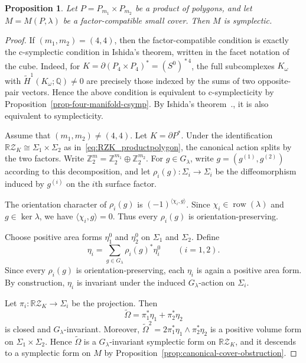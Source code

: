 \documentclass{amsart}
\newtheorem{proposition}[theorem]{Proposition}
\numberwithin{equation}{section}
\theoremstyle{definition}
\theoremstyle{remark}
\newcommand{\Z}{\mathbb Z}
\newcommand{\Q}{\mathbb Q}
\newcommand{\RZ}{\mathbb R\mathcal Z}
\DeclareMathOperator{\join}{\ast}
\DeclareMathOperator{\row}{row}
\begin{document}
\begin{proposition}\label{prop:factor-compatible-symplectic}
    Let $P=P_{m_1}\times P_{m_2}$ be a product of polygons, and let $M=M(P,\lambda)$ be a factor-compatible small cover.
    Then $M$ is symplectic.
\end{proposition}
\begin{proof}
    If $(m_1,m_2)=(4,4)$, then the factor-compatible condition is exactly the c-symplectic condition in Ishida's theorem, written in the facet notation of the cube. 
    Indeed, for $K=\partial(P_4\times P_4)^\ast=(S^0)^{\join 4}$, the full subcomplexes $K_\omega$ with $\widetilde H^1(K_\omega;\Q)\neq 0$ are precisely those indexed by the sums of two opposite-pair vectors. 
    Hence the above condition is equivalent to c-symplecticity by Proposition~\ref{prop-four-manifold-csymp}.
    By Ishida's theorem~\cite{Ishida2011}., it is also equivalent to symplecticity.
    
    Assume that $(m_1,m_2)\neq(4,4)$.
    Let $K=\partial P^\ast$.
    Under the identification $\RZ_K\cong \Sigma_1\times\Sigma_2$ as in~\eqref{eq:RZK_productpolygon}, the canonical action splits by the two factors.
    Write $\Z_2^m=\Z_2^{m_1}\oplus\Z_2^{m_2}$.
    For $g\in G_\lambda$, write $g=(g^{(1)},g^{(2)})$ according to this decomposition, and let $\rho_i(g)\colon \Sigma_i\to\Sigma_i$ be the diffeomorphism induced by $g^{(i)}$ on the $i$th surface factor.
    
    The orientation character of $\rho_i(g)$ is $(-1)^{\langle \chi_i,g\rangle}$.
    Since $\chi_i\in\row(\lambda)$ and $g\in\ker\lambda$, we have $\langle\chi_i,g\rangle=0$.
    Thus every $\rho_i(g)$ is orientation-preserving.
    
    Choose positive area forms $\eta_1^0$ and $\eta_2^0$ on $\Sigma_1$ and $\Sigma_2$.
    Define
    $$
        \eta_i=\sum_{g\in G_\lambda}\rho_i(g)^\ast\eta_i^0 \qquad (i=1,2).
    $$
    Since every $\rho_i(g)$ is orientation-preserving, each $\eta_i$ is again a positive area form.
    By construction, $\eta_i$ is invariant under the induced $G_\lambda$-action on $\Sigma_i$.
    
    Let $\pi_i \colon \RZ_K\to \Sigma_i$ be the projection. 
    Then 
    $$
        \widetilde\Omega = \pi_1^\ast\eta_1+\pi_2^\ast \eta_2
    $$
    is closed and $G_\lambda$-invariant. 
    Moreover, $\widetilde\Omega^2 = 2\pi_1^\ast\eta_1\wedge \pi_2^\ast\eta_2$ is a positive volume form on $\Sigma_1 \times \Sigma_2$.
    Hence $\widetilde\Omega$ is a $G_\lambda$-invariant symplectic form on $\RZ_K$, and it descends to a symplectic form on $M$ by Proposition~\ref{prop:canonical-cover-obstruction}.
\end{proof}
\end{document}
